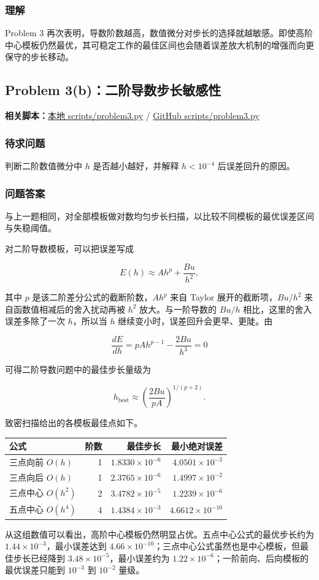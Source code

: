 \documentclass[12pt,a4paper,fontset=none]{ctexart}
\newcommand{\problem}[1]{\subsection{#1}}
\newcommand{\blocktitle}[1]{\subsubsection{#1}}
\newcommand{\scriptpath}[1]{{#1}}
\newcommand{\githubscriptsbase}{https://github.com/Void0312Aurora/computational-physics-homework-2026/blob/main/06/scripts}
\newcommand{\scriptlink}[1]{\noindent\textbf{相关脚本：}\href{../../../scripts/#1}{\scriptpath{本地 scripts/#1}} / \href{\githubscriptsbase/#1}{\scriptpath{GitHub scripts/#1}}\par\medskip}
\begin{document}
\blocktitle{理解}

Problem 3 再次表明，导数阶数越高，数值微分对步长的选择就越敏感。即使高阶中心模板仍然最优，其可稳定工作的最佳区间也会随着误差放大机制的增强而向更保守的步长移动。

\problem{Problem 3(b)：二阶导数步长敏感性}

\scriptlink{problem3.py}

\blocktitle{待求问题}
判断二阶数值微分中 \(h\) 是否越小越好，并解释 \(h<10^{-4}\) 后误差回升的原因。

\blocktitle{问题答案}
与上一题相同，对全部模板做对数均匀步长扫描，以比较不同模板的最优误差区间与失稳阈值。

对二阶导数模板，可以把误差写成

\[
E(h)\approx A h^p+\frac{Bu}{h^2},
\]

其中 \(p\) 是该二阶差分公式的截断阶数，\(Ah^p\) 来自 Taylor 展开的截断项，\(Bu/h^2\) 来自函数值相减后的舍入扰动再被 \(h^2\) 放大。与一阶导数的 \(Bu/h\) 相比，这里的舍入误差多除了一次 \(h\)，所以当 \(h\) 继续变小时，误差回升会更早、更陡。由

\[
\frac{dE}{dh}=pAh^{p-1}-\frac{2Bu}{h^3}=0
\]

可得二阶导数问题中的最佳步长量级为

\[
h_{\mathrm{best}}\approx \left(\frac{2Bu}{pA}\right)^{1/(p+2)}.
\]

致密扫描给出的各模板最佳点如下。

\begin{table}[H]
  \centering
  \small
  \begin{tabular}{lrrr}
    \toprule
    公式 & 阶数 & 最佳步长 & 最小绝对误差 \\
    \midrule
    三点向前 \(O(h)\) & 1 & \(1.8330\times 10^{-6}\) & \(4.0501\times 10^{-3}\) \\
    三点向后 \(O(h)\) & 1 & \(2.3765\times 10^{-6}\) & \(1.4997\times 10^{-2}\) \\
    三点中心 \(O(h^2)\) & 2 & \(3.4782\times 10^{-5}\) & \(1.2239\times 10^{-6}\) \\
    五点中心 \(O(h^4)\) & 4 & \(1.4384\times 10^{-3}\) & \(4.6612\times 10^{-10}\) \\
    \bottomrule
  \end{tabular}
\end{table}

从这组数值可以看出，高阶中心模板仍然明显占优。五点中心公式的最优步长约为 \(1.44\times 10^{-3}\)，最小误差达到 \(4.66\times 10^{-10}\)；三点中心公式虽然也是中心模板，但最佳步长已经降到 \(3.48\times 10^{-5}\)，最小误差约为 \(1.22\times 10^{-6}\)；一阶前向、后向模板的最优误差只能到 \(10^{-3}\) 到 \(10^{-2}\) 量级。
\end{document}

